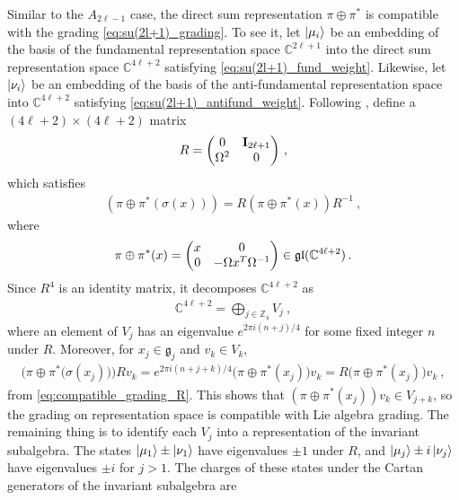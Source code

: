 Similar to the $ A_{2\ell-1} $ case, the direct sum representation $ \pi \oplus \pi^* $ is compatible with the grading \eqref{eq:su(2l+1)_grading}. To see it, let $ \ket{\mu_i} $ be an embedding of the basis of the fundamental representation space $ \mathbb{C}^{2\ell+1} $ into the direct sum representation space $ \mathbb{C}^{4\ell+2} $ satisfying \eqref{eq:su(2l+1)_fund_weight}. Likewise, let $ \ket{\nu_i} $ be an embedding of the basis of the anti-fundamental representation space into $ \mathbb{C}^{4\ell+2} $ satisfying \eqref{eq:su(2l+1)_antifund_weight}. Following \cite{havlicek_representations_2009}, define a $ (4\ell + 2) \times (4\ell + 2) $ matrix
\begin{align}
R = \mqty(0 & \mathbf{I}_{2\ell+1} \\ \Omega^2 & 0)\ ,
\end{align}
which satisfies
\begin{align}\label{eq:compatible_grading_R}
(\pi \oplus \pi^* (\sigma(x))) = R (\pi \oplus \pi^*(x)) R^{-1}\ ,
\end{align}
where
\begin{align}
\pi \oplus \pi^*(x) = \mqty(x & 0 \\ 0 & -\Omega x^T \Omega^{-1}) \in \mathfrak{gl}(\mathbb{C}^{4\ell+2}) \, .
\end{align}
Since $ R^4 $ is an identity matrix, %
 it decomposes $ \mathbb{C}^{4\ell+2} $ as
\begin{align}\label{eq:su(2l+1)_fund_decomp}
\mathbb{C}^{4\ell+2} = \bigoplus_{j \in \mathbb{Z}_4} V_j\ ,
\end{align}
where an element of $ V_j $ has an eigenvalue $ e^{2\pi i (n+j)/4} $ for some fixed integer $ n $ under $ R $. Moreover, for $ x_j \in \mathfrak{g}_j $ and $ v_k \in V_k $,
\begin{align}
\Big(\pi \oplus \pi^*\big(\sigma(x_j)\big)\Big)R v_k
= e^{2\pi i (n+j+k)/4} \big(\pi \oplus \pi^*(x_j)\big) v_k = R \big(\pi \oplus \pi^*(x_j)\big) v_k\ ,
\end{align}
from \eqref{eq:compatible_grading_R}. This shows that $ (\pi \oplus \pi^*(x_j)) v_k \in V_{j+k} $, so the grading on representation space is compatible with Lie algebra grading. The remaining thing is to identify each $ V_j $ into a representation of the invariant subalgebra. The states $ \ket{\mu_1} \pm \ket{\nu_1} $ have eigenvalues $ \pm 1 $ under $ R $, and $ \ket{\mu_j} \pm i\ket{\nu_j} $ have eigenvalues $ \pm i $ for $ j > 1 $. The charges of these states under the Cartan generators of the invariant subalgebra are

